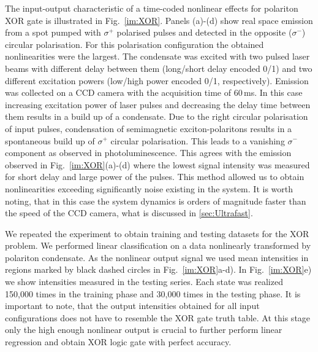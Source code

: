 \documentclass[
 print,
 amsmath,amssymb,
 aps,
]{revtex4-2}
\begin{document}
	The input-output characteristic of a time-coded nonlinear effects for polariton XOR gate is illustrated in Fig.~\ref{im:XOR}. Panels (a)-(d) show real space emission from a spot pumped with $\sigma^+$ polarised pulses and detected in the opposite ($\sigma^-$) circular polarisation. For this polarisation configuration the obtained nonlinearities were the largest. The condensate was excited with two pulsed laser beams with different delay between them (long/short delay encoded 0/1) and two different excitation powers (low/high power encoded 0/1, respectively). Emission was collected on a CCD camera with the acquisition time of 60\,ms. In this case increasing excitation power of laser pulses and decreasing the delay time between them results in a build up of a condensate. Due to the right circular polarisation of input pulses, condensation of semimagnetic exciton-polaritons results in a spontaneous build up of $\sigma^+$ circular polarisation. This leads to a vanishing $\sigma^-$ component as observed in photoluminescence. This agrees with the emission observed in Fig.~\ref{im:XOR}(a)-(d) where the lowest signal intensity was measured for short delay and large power of the pulses. This method allowed us to obtain nonlinearities exceeding significantly noise existing in the system. It is worth noting, that in this case the system dynamics is orders of magnitude faster than the speed of the CCD camera, what is discussed in \ref{sec:Ultrafast}.

	We repeated the experiment to obtain training and testing datasets for the XOR problem. We performed linear classification on a data nonlinearly transformed by polariton condensate. As the nonlinear output signal we used mean intensities in regions marked by black dashed circles in Fig.~\ref{im:XOR}a-d). In Fig.~\ref{im:XOR}e) we show intensities measured in the testing series. Each state was realized 150,000 times in the training phase and 30,000 times in the testing phase. It is important to note, that the output intensities obtained for all input configurations does not have to resemble the XOR gate truth table. At this stage only the high enough nonlinear output is crucial to further perform linear regression and obtain XOR logic gate with perfect accuracy.
	
\end{document}
